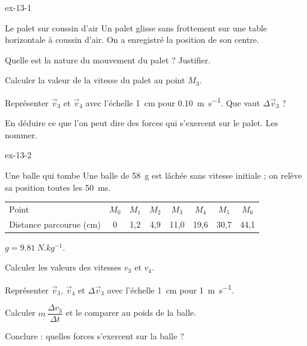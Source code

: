 \begin{blocLivre}{ex-13-1}
\begin{exercice}[1]{Le palet sur coussin d'air}
Un palet glisse sans frottement sur une table horizontale à coussin d'air. On a enregistré la position de son centre.
\begin{questions}
\item Quelle est la nature du mouvement du palet ? Justifier.
\item Calculer la valeur de la vitesse du palet au point $M_3$.
\item Représenter $\vec{v}_3$ et $\vec{v}_4$ avec l'échelle \qty{1}{cm} pour \qty{0,10}{m.s^{-1}}. Que vaut $\Delta\vec{v}_3$ ?
\item En déduire ce que l'on peut dire des forces qui s'exercent sur le palet. Les nommer.
\end{questions}
\end{exercice}
\end{blocLivre}
\begin{blocLivre}{ex-13-2}
\begin{exercice}[1]{Une balle qui tombe}
Une balle de \qty{58}{g} est lâchée sans vitesse initiale ; on relève sa position toutes les \qty{50}{ms}.
\par\smallskip\noindent\hfill\begin{tabular}{lccccccc}
\toprule
Point & $M_0$ & $M_1$ & $M_2$ & $M_3$ & $M_4$ & $M_5$ & $M_6$ \\
Distance parcourue (cm) & 0 & 1,2 & 4,9 & 11,0 & 19,6 & 30,7 & 44,1 \\
\bottomrule
\end{tabular}\hfill\null\par\smallskip
\begin{donnees}
$g=\qty{9,81}{N.kg^{-1}}$.
\end{donnees}
\begin{questions}
\item Calculer les valeurs des vitesses $v_3$ et $v_4$.
\item Représenter $\vec{v}_3$, $\vec{v}_4$ et $\Delta\vec{v}_3$ avec l'échelle \qty{1}{cm} pour \qty{1}{m.s^{-1}}.
\item Calculer $m\,\dfrac{\Delta v_3}{\Delta t}$ et le comparer au poids de la balle.
\item Conclure : quelles forces s'exercent sur la balle ?
\end{questions}
\end{exercice}
\end{blocLivre}

